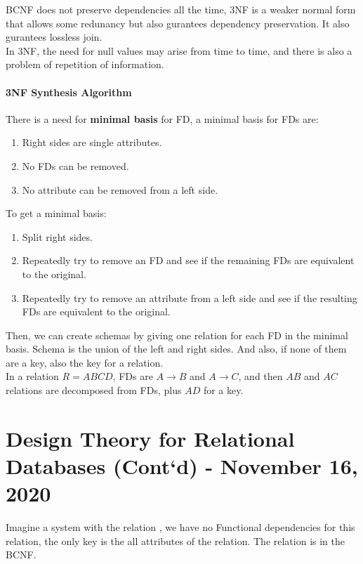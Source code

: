 \documentclass[11pt,a4paper,twocolumn]{book}
\begin{document}
BCNF does not preserve dependencies all the time, 3NF is a weaker normal form that allows some redunancy but also gurantees dependency preservation. It also gurantees lossless join.\\

In 3NF, the need for null values may arise from time to time, and there is also a problem of repetition of information.

\subsubsection{3NF Synthesis Algorithm}

There is a need for \textbf{minimal basis} for FD, a minimal basis  for FDs are:

\begin{enumerate}
\item Right sides are single attributes.
\item No FDs can be removed.
\item No attribute can be removed from a left side.
\end{enumerate}

To get a minimal basis:

\begin{enumerate}
\item Split right sides.
\item Repeatedly try to remove an FD and see if the remaining FDs are equivalent to the original.
\item Repeatedly try to remove an attribute from a left side and see if the resulting FDs are equivalent to the original.
\end{enumerate}

Then, we can create schemas by giving one relation for each FD in the minimal basis. Schema is the union of the left and right sides. And also, if none of them are a key, also the key for a relation.\\

In a relation $R=ABCD$, FDs are $A \to B$ and $A \to C$, and then $AB$ and $AC$ relations are decomposed from FDs, plus $AD$ for a key.

\chapter{Design Theory for Relational Databases (Cont`d) - November 16, 2020}

\newcommand{\C}[1]{\code{#1}}
\newcommand{\ApplyExample}{\C{Apply(SSN, cName, hobby)}}
Imagine a system with the relation \C{Apply(SSN, cName, hobby)}, we have no Functional dependencies for this relation, the only key is the all attributes of the relation. The relation is in the BCNF.\\
\end{document}
